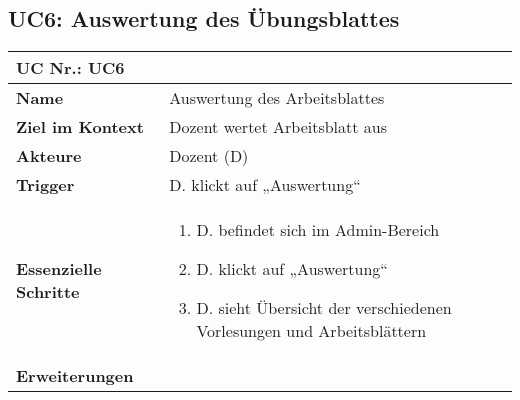 \begin{table}[h]
\subsection{UC6: Auswertung des Übungsblattes}
	\begin{tabular}{|p{3cm}|p{11.06cm}|}
	\hline
		\multicolumn{2}{|l|}{\textbf{UC Nr.: UC6} }   \\ \hline
		\textbf{Name}                 &     Auswertung des Arbeitsblattes    \\ \hline
		\textbf{Ziel im Kontext}      &     Dozent wertet Arbeitsblatt aus   \\ \hline
		\textbf{Akteure}              &     Dozent (D)    \\ \hline
		\textbf{Trigger}              &     D. klickt auf „Auswertung“    \\ \hline
		\textbf{Essenzielle Schritte} & 
			\begin{enumerate}
			  \item D. befindet sich im Admin-Bereich
			  \item D. klickt auf „Auswertung“
			  \item D. sieht Übersicht der verschiedenen Vorlesungen und Arbeitsblättern
			\end{enumerate}
		\\ \hline
		\textbf{Erweiterungen} 		  &         \\ \hline
	\end{tabular}
\end{table}\FloatBarrier

